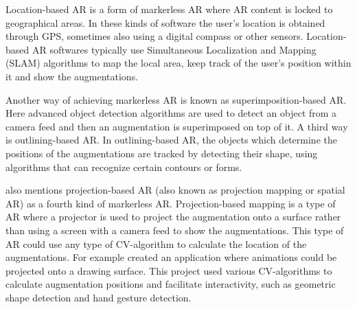 	Location-based AR is a form of markerless AR where AR content is 
locked to geographical areas.\cite{locAR} In these kinds of software the user's 
location is obtained through GPS, sometimes also using a digital compass or 
other sensors.\cite{locAR} Location-based AR softwares typically use 
Simultaneous Localization and Mapping (SLAM) algorithms  to map the local area, 
keep track of the user's position within it and show the 
augmentations.\cite{estrada}\cite{slam}\cite{minaee2022modernaugmentedrealityapplications}\par
	Another way of achieving markerless AR is known as 
superimposition-based AR. Here advanced object detection algorithms are used 
to detect an object from a camera feed and then an augmentation is 
superimposed on top of it.\cite{estrada} A third way is outlining-based AR. 
In outlining-based AR, the objects which determine the positions of the 
augmentations are tracked by detecting their shape, using algorithms that can 
recognize certain contours or forms.\cite{estrada}\par
	\textcite{estrada} also mentions projection-based AR (also known as 
projection mapping or spatial AR) as a fourth kind of markerless AR. 
Projection-based mapping is a type of AR where a projector is used to project 
the augmentation onto a surface rather than using a screen with a camera feed 
to show the augmentations.\cite{estrada} This type of AR could use any type 
of CV-algorithm to calculate the location of the augmentations. For example 
\textcite{lamp} created an application where animations could be projected 
onto a drawing surface. This project used various CV-algorithms to calculate 
augmentation positions and facilitate interactivity, such as geometric shape 
detection and hand gesture detection.\cite{lamp}
